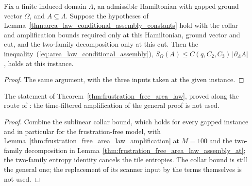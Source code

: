 \begin{lemma}
    \label{thm:frustration_free_area_law_assembly_at}
    \leanok
    Fix a finite induced domain $\Lambda$, an admissible Hamiltonian with
    gapped ground vector $\Omega$, and $A\subseteq\Lambda$. Suppose the
    hypotheses of Lemma~\ref{thm:area_law_conditional_assembly_constants} hold
    with the collar and amplification bounds required only at this
    Hamiltonian, ground vector and cut, and the two-family decomposition only
    at this cut. Then the inequality~(\ref{eq:area_law_conditional_assembly}),
    $S_\Omega(A)\le C(q,C_2,C_3)\,|\partial_\Lambda A|$, holds at this
    instance.
\end{lemma}

\begin{proof}\leanok
    The same argument, with the three inputs taken at the given instance.
\end{proof}

\begin{lemma}
    \label{thm:frustration_free_area_law_sweep_route}
    \leanok
    The statement of Theorem~\ref{thm:frustration_free_area_law}, proved along the route of
    \cite{TNLean2026FrustrationFreeNote}: the time-filtered amplification of
    the general proof is not used.
\end{lemma}

\begin{proof}\leanok
    Combine the sublinear collar bound, which holds for every gapped instance
    and in particular for the frustration-free model, with
    Lemma~\ref{thm:frustration_free_area_law_amplification} at $M=100$ and the two-family
    decomposition in Lemma~\ref{thm:frustration_free_area_law_assembly_at}; the two-family
    entropy identity cancels the tile entropies. The collar bound is still the
    general one; the replacement of its scanner input by the terms
    themselves \cite[eq.~(identity)]{TNLean2026FrustrationFreeNote} is not
    used.
\end{proof}
